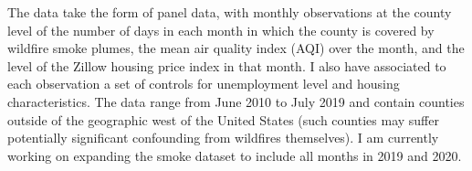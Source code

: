\documentclass[12pt]{article}
\begin{document}
The data take the form of panel data, with monthly observations at the county level
of the number of days in each month in which the county is covered by wildfire 
smoke plumes, the mean air quality index (AQI) over the month, and the level of 
the Zillow housing price index in that month.  I also have associated to each observation a set of controls for unemployment level and housing characteristics. 
The data range from June 2010 to July 2019 and contain counties outside of the
geographic west of the United States (such counties may suffer potentially
significant confounding from wildfires themselves).  I am currently working on 
expanding the smoke dataset to include all months in 2019 and 2020.





\end{document}
